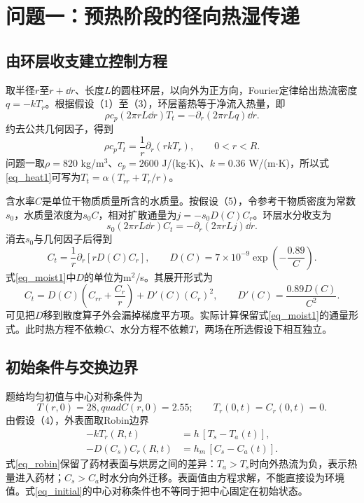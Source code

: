 \section{问题一：预热阶段的径向热湿传递}
\subsection{由环层收支建立控制方程}
取半径$r$至$r+\dd r$、长度$L$的圆柱环层，以向外为正方向，Fourier定律给出热流密度$q=-kT_r$。根据假设（1）至（3），环层蓄热等于净流入热量，即
\[
\rho c_p(2\pi rL\dd r)T_t=-\partial_r(2\pi rLq)\dd r.
\]
约去公共几何因子，得到
\begin{equation}\label{eq_heat1}
\rho c_p T_t=\frac1r\partial_r(rkT_r),\qquad 0<r<R.
\end{equation}
问题一取$\rho=820$ kg/m$^3$、$c_p=2600$ J/(kg$\cdot$K)、$k=0.36$ W/(m$\cdot$K)，所以式\eqref{eq_heat1}可写为$T_t=\alpha(T_{rr}+T_r/r)$。

含水率$C$是单位干物质质量所含的水质量。按假设（5），令参考干物质密度为常数$s_0$，水质量浓度为$s_0C$，相对扩散通量为$j=-s_0D(C)C_r$。环层水分收支为
\[
s_0(2\pi rL\dd r)C_t=-\partial_r(2\pi rLj)\dd r.
\]
消去$s_0$与几何因子后得到
\begin{equation}\label{eq_moist1}
C_t=\frac1r\partial_r\!\left[rD(C)C_r\right],\qquad
D(C)=7\times10^{-9}\exp\!\left(-\frac{0.89}{C}\right).
\end{equation}
式\eqref{eq_moist1}中$D$的单位为m$^2$/s。其展开形式为
\[
C_t=D(C)\left(C_{rr}+\frac{C_r}{r}\right)+D'(C)(C_r)^2,
\qquad D'(C)=\frac{0.89D(C)}{C^2}.
\]
可见把$D$移到散度算子外会漏掉梯度平方项。实际计算保留式\eqref{eq_moist1}的通量形式。此时热方程不依赖$C$、水分方程不依赖$T$，两场在所选假设下相互独立。

\subsection{初始条件与交换边界}
题给均匀初值与中心对称条件为
\begin{equation}\label{eq_initial}
T(r,0)=28,quad C(r,0)=2.55;\qquad
T_r(0,t)=C_r(0,t)=0.
\end{equation}
由假设（4），外表面取Robin边界
\begin{equation}\label{eq_robin}
\begin{aligned}
-kT_r(R,t)&=h\,[T_s-T_a(t)],\\
-D(C_s)C_r(R,t)&=h_m\,[C_s-C_a(t)].
\end{aligned}
\end{equation}
式\eqref{eq_robin}保留了药材表面与烘房之间的差异：$T_a>T_s$时向外热流为负，表示热量进入药材；$C_s>C_a$时水分向外迁移。表面值由方程求解，不能直接设为环境值。式\eqref{eq_initial}的中心对称条件也不等同于把中心固定在初始状态。

